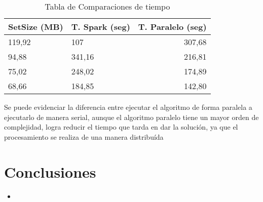 \documentclass[fleqn,10pt]{SelfArx} %
\begin{document}
\begin{table}[hbt]
	\caption{Tabla de Comparaciones de tiempo}
	\centering
	\begin{tabular}{llr}
		\cmidrule(r){1-3}
		SetSize (MB) & T. Spark (seg) & T. Paralelo (seg)\\
		\midrule
		
		119,92 & 107 & 307,68 \\
		
		94,88 & 341,16 & 216,81 \\
		
		75,02 & 248,02 & 174,89 \\
		
		68,66 & 184,85 & 142,80 \\
		
		\bottomrule
	\end{tabular}
	\label{tab:label}
\end{table}


Se puede evidenciar la diferencia entre ejecutar el algoritmo de forma paralela a ejecutarlo de manera serial, aunque el algoritmo paralelo tiene un mayor orden de complejidad, logra reducir el tiempo que tarda en dar la solución, ya que el procesamiento se realiza de una manera distribuída




\section*{Conclusiones} %


\begin{itemize}
	\item 
\end{itemize}

\end{document}
